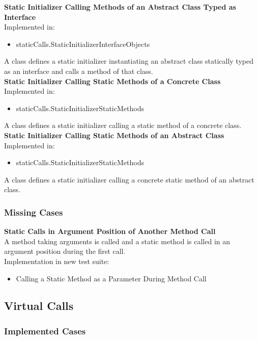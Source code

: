 \documentclass{article}
\begin{document}
\noindent
\textbf{Static Initializer Calling Methods of an Abstract Class Typed as Interface}\\
Implemented in: 
\begin{itemize}
    \item staticCalls.StaticInitializerInterfaceObjects
\end{itemize}
A class defines a static initializer instantiating an abstract class statically typed as an interface and calls a method of that class.\\

\noindent
\textbf{Static Initializer Calling Static Methods of a Concrete Class}\\
Implemented in: 
\begin{itemize}
    \item staticCalls.StaticInitializerStaticMethods
\end{itemize}
A class defines a static initializer calling a static method of a concrete class.\\

\noindent
\textbf{Static Initializer Calling Static Methods of an Abstract Class}\\
Implemented in: 
\begin{itemize}
    \item staticCalls.StaticInitializerStaticMethods
\end{itemize}
A class defines a static initializer calling a concrete static method of an abstract class.\\

\subsubsection{Missing Cases}

\textbf{Static Calls in Argument Position of Another Method Call}\\
A method taking arguments is called and a static method is called in an argument position during the first call.\\
Implementation in new test suite: 
\begin{itemize}
    \item Calling a Static Method as a Parameter During Method Call
\end{itemize}


\subsection{Virtual Calls}
\subsubsection{Implemented Cases}
\end{document}
